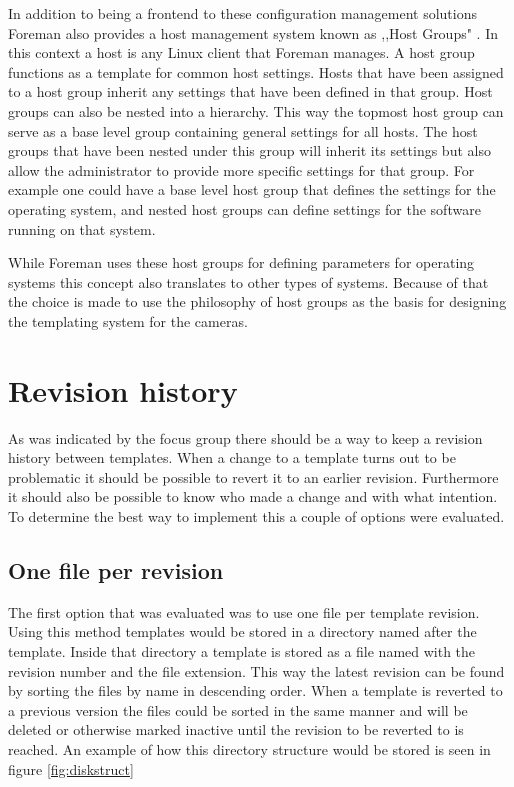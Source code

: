 In addition to being a frontend to these configuration management solutions Foreman also provides a host management system known as ,,Host Groups" \cite{noauthor_foreman_nodate-1}. In this context a host is any Linux client that Foreman manages.
A host group functions as a template for common host settings.
Hosts that have been assigned to a host group inherit any settings that have been defined in that group.
Host groups can also be nested into a hierarchy.
This way the topmost host group can serve as a base level group containing general settings for all hosts.
The host groups that have been nested under this group will inherit its settings but also allow the administrator to provide more specific settings for that group.
For example one could have a base level host group that defines the settings for the operating system, and nested host groups can define settings for the software running on that system.

While Foreman uses these host groups for defining parameters for operating systems this concept also translates to other types of systems.
Because of that the choice is made to use the philosophy of host groups as the basis for designing the templating system for the cameras.

\section{Revision history}
As was indicated by the focus group there should be a way to keep a revision history between templates.
When a change to a template turns out to be problematic it should be possible to revert it to an earlier revision.
Furthermore it should also be possible to know who made a change and with what intention.
To determine the best way to implement this a couple of options were evaluated.

\subsection{One file per revision}
The first option that was evaluated was to use one file per template revision.
Using this method templates would be stored in a directory named after the template.
Inside that directory a template is stored as a file named with the revision number and the file extension.
This way the latest revision can be found by sorting the files by name in descending order.
When a template is reverted to a previous version the files could be sorted in the same manner and will be deleted or otherwise marked inactive until the revision to be reverted to is reached. An example of how this directory structure would be stored is seen in figure \ref{fig:diskstruct}

